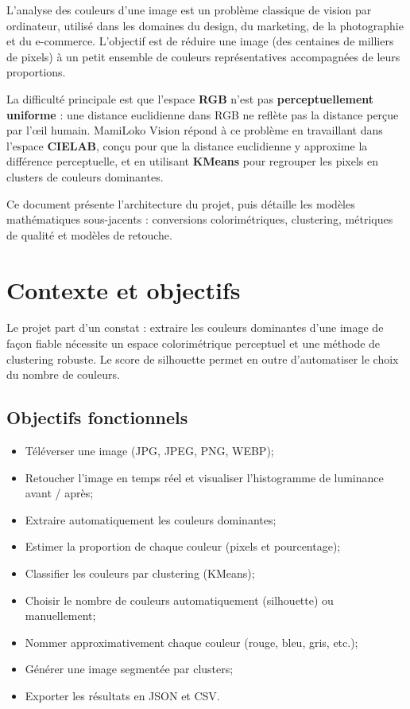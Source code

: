 \documentclass[11pt,a4paper]{article}
\begin{document}
L'analyse des couleurs d'une image est un problème classique de vision par
ordinateur, utilisé dans les domaines du design, du marketing, de la
photographie et du e-commerce. L'objectif est de réduire une image (des
centaines de milliers de pixels) à un petit ensemble de couleurs
représentatives accompagnées de leurs proportions.

La difficulté principale est que l'espace \textbf{RGB} n'est pas
\textbf{perceptuellement uniforme} : une distance euclidienne dans RGB ne
reflète pas la distance perçue par l'œil humain. MamiLoko Vision répond à ce
problème en travaillant dans l'espace \textbf{CIELAB}, conçu pour que la
distance euclidienne y approxime la différence perceptuelle, et en
utilisant \textbf{KMeans} pour regrouper les pixels en clusters de couleurs
dominantes.

Ce document présente l'architecture du projet, puis détaille les modèles
mathématiques sous-jacents : conversions colorimétriques, clustering,
métriques de qualité et modèles de retouche.

\section{Contexte et objectifs}

Le projet part d'un constat : extraire les couleurs dominantes d'une image
de façon fiable nécessite un espace colorimétrique perceptuel et une
méthode de clustering robuste. Le score de silhouette permet en outre
d'automatiser le choix du nombre de couleurs.

\subsection{Objectifs fonctionnels}

\begin{itemize}
  \item Téléverser une image (JPG, JPEG, PNG, WEBP);
  \item Retoucher l'image en temps réel et visualiser l'histogramme de
        luminance avant / après;
  \item Extraire automatiquement les couleurs dominantes;
  \item Estimer la proportion de chaque couleur (pixels et pourcentage);
  \item Classifier les couleurs par clustering (KMeans);
  \item Choisir le nombre de couleurs automatiquement (silhouette) ou
        manuellement;
  \item Nommer approximativement chaque couleur (rouge, bleu, gris,
        etc.);
  \item Générer une image segmentée par clusters;
  \item Exporter les résultats en JSON et CSV.
\end{itemize}
\end{document}
